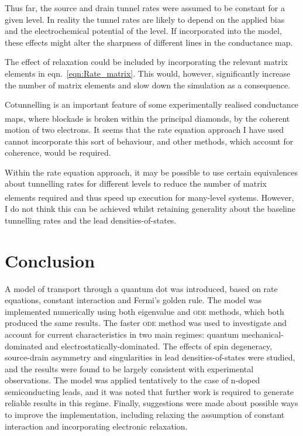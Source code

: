 \documentclass[a4paper,11pt]{article}
\let\oldcite\cite
\renewcommand{\cite}[1]{\textsuperscript{\oldcite{#1}}}
\begin{document}
    Thus far, the source and drain tunnel rates were assumed to be constant for a given level. In reality the tunnel rates are likely to depend on the applied bias and the electrochemical potential of the level. If incorporated into the model, these effects might alter the sharpness of different lines in the conductance map.

    The effect of relaxation could be included by incorporating the relevant matrix elements in eqn.~\ref{eqn:Rate_matrix}. This would, however, significantly increase the number of matrix elements and slow down the simulation as a consequence.

    Cotunnelling is an important feature of some experimentally realised conductance maps\cite{Guttinger-2012}, where blockade is broken within the principal diamonds, by the coherent motion of two electrons. It seems that the rate equation approach I have used cannot incorporate this sort of behaviour, and other methods, which account for coherence, would be required.

    Within the rate equation approach, it may be possible to use certain equivalences about tunnelling rates for different levels to reduce the number of matrix elements required and thus speed up execution for many-level systems\cite{Klimeck-1994}. However, I do not think this can be achieved whilst retaining generality about the baseline tunnelling rates and the lead densities-of-states.




    \section{Conclusion}
    A model of transport through a quantum dot was introduced, based on rate equations, constant interaction and Fermi's golden rule. The model was implemented numerically using both eigenvalue and \textsc{ode} methods, which both produced the same results. The faster \textsc{ode} method was used to investigate and account for current characteristics in two main regimes: quantum mechanical-dominated and electrostatically-dominated. The effects of spin degeneracy, source-drain asymmetry and singularities in lead densities-of-states were studied, and the results were found to be largely consistent with experimental observations. The model was applied tentatively to the case of n-doped semiconducting leads, and it was noted that further work is required to generate reliable results in this regime. Finally, suggestions were made about possible ways to improve the implementation, including relaxing the assumption of constant interaction and incorporating electronic relaxation.
\end{document}

